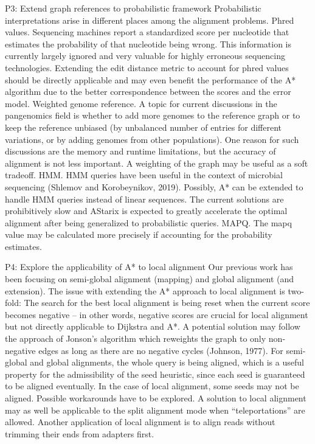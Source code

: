 P3: Extend graph references to probabilistic framework Probabilistic
interpretations arise in different places among the alignment problems. Phred
values. Sequencing machines report a standardized score per nucleotide that
estimates the probability of that nucleotide being wrong. This information is
currently largely ignored and very valuable for highly erroneous sequencing
technologies. Extending the edit distance metric to account for phred values
should be directly applicable and may even benefit the performance of the A*
algorithm due to the better correspondence between the scores and the error
model. Weighted genome reference. A topic for current discussions in the
pangenomics field is whether to add more genomes to the reference graph or to
keep the reference unbiased (by unbalanced number of entries for different
variations, or by adding genomes from other populations). One reason for such
discussions are the memory and runtime limitations, but the accuracy of
alignment is not less important. A weighting of the graph may be useful as a
soft tradeoff. HMM. HMM queries have been useful in the context of microbial
sequencing (Shlemov and Korobeynikov, 2019). Possibly, A* can be extended to
handle HMM queries instead of linear sequences. The current solutions are
prohibitively slow and AStarix is expected to greatly accelerate the optimal
alignment after being generalized to probabilistic queries. MAPQ. The mapq value
may be calculated more precisely if accounting for the probability estimates.

P4: Explore the applicability of A* to local alignment Our previous work has
been focusing on semi-global alignment (mapping) and global alignment (and
extension). The issue with extending the A* approach to local alignment is
two-fold: The search for the best local alignment is being reset when the
current score becomes negative – in other words, negative scores are crucial for
local alignment but not directly applicable to Dijkstra and A*. A potential
solution may follow the approach of Jonson’s algorithm which reweights the graph
to only non-negative edges as long as there are no negative cycles (Johnson,
1977). For semi-global and global alignments, the whole query is being aligned,
which is a useful property for the admissibility of the seed heuristic, since
each seed is guaranteed to be aligned eventually. In the case of local
alignment, some seeds may not be aligned. Possible workarounds have to be
explored. A solution to local alignment may as well be applicable to the split
alignment mode when “teleportations” are allowed. Another application of local
alignment is to align reads without trimming their ends from adapters first.

